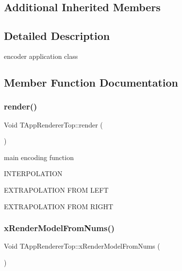 \subsection*{Additional Inherited Members}


\subsection{Detailed Description}
encoder application class 

\subsection{Member Function Documentation}
\mbox{\label{class_t_app_renderer_top_a0f9693638b0bb6fa40fdab529974cb80}} 
\subsubsection{\texorpdfstring{render()}{render()}}
{\footnotesize\ttfamily Void T\+App\+Renderer\+Top\+::render (\begin{DoxyParamCaption}{ }\end{DoxyParamCaption})}



main encoding function 

I\+N\+T\+E\+R\+P\+O\+L\+A\+T\+I\+ON

E\+X\+T\+R\+A\+P\+O\+L\+A\+T\+I\+ON F\+R\+OM L\+E\+FT

E\+X\+T\+R\+A\+P\+O\+L\+A\+T\+I\+ON F\+R\+OM R\+I\+G\+HT \mbox{\label{class_t_app_renderer_top_ac1d924fe9ae49d24ab3dab1cedc99a8a}} 
\subsubsection{\texorpdfstring{x\+Render\+Model\+From\+Nums()}{xRenderModelFromNums()}}
{\footnotesize\ttfamily Void T\+App\+Renderer\+Top\+::x\+Render\+Model\+From\+Nums (\begin{DoxyParamCaption}{ }\end{DoxyParamCaption})\hspace{0.3cm}{\ttfamily [protected]}}



